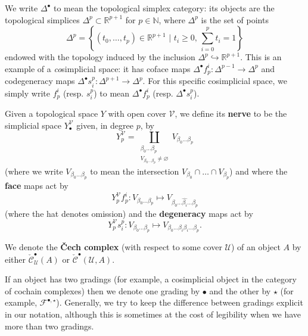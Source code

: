 \documentclass[11pt,fleqn]{article}
\theoremstyle{plain}
\theoremstyle{definition}
\theoremstyle{remark}
\numberwithin{equation}{theorem}
\newcommand{\cover}{\mathcal{U}}
\newcommand{\anothercover}{\mathcal{V}}
\newcommand{\anotherbullet}{\star}
\newcommand{\cech}{\check{\mathscr{C}}}
\newcommand{\define}[1]{\textbf{#1}}
\newcommand{\anothernerve}[1]{Y_{#1}^\anothercover}
\begin{document}
        We write $\Delta^\bullet$ to mean the topological simplex category: its objects are the topological simplices $\Delta^p\subset\mathbb{R}^{p+1}$ for $p\in\mathbb{N}$, where $\Delta^p$ is the set of points
        \[
            \Delta^p
            =
            \left\{
                (t_0,\ldots,t_p)
                \in \mathbb{R}^{p+1}
                \,\,\Big\vert\,\,
                t_i\geqslant0,
                \,\sum_{i=0}^p t_i =1
            \right\}
        \]
        endowed with the topology induced by the inclusion $\Delta^p\hookrightarrow\mathbb{R}^{p+1}$.
        This is an example of a \emph{co}simplicial space: it has {coface} maps $\Delta^\bullet f_p^i\colon\Delta^{p-1}\to\Delta^p$ and {codegeneracy} maps $\Delta^\bullet s_i^p\colon\Delta^{p+1}\to\Delta^p$.
        For this specific cosimplicial space, we simply write $f_p^i$ (resp. $s_i^p$) to mean $\Delta^\bullet f_p^i$ (resp. $\Delta^\bullet s_i^p$).

        Given a topological space $Y$ with open cover $\anothercover$, we define its \define{nerve} to be the simplicial space $\anothernerve{\bullet}$ given, in degree $p$, by
        \[
            \anothernerve{p} = \coprod_{\substack{\beta_0\ldots\beta_p \\ V_{\beta_0\ldots\beta_p}\neq\varnothing}} V_{\beta_0\ldots\beta_p}
        \]
        (where we write $V_{\beta_0\ldots\beta_p}$ to mean the intersection $V_{\beta_0}\cap\ldots\cap V_{\beta_p}$) and where the \define{face} maps act by
        \[
            \anothernerve{p}f_p^i\colon V_{\beta_0\ldots\beta_p} \mapsto V_{\beta_0\ldots\widehat{\beta_i}\ldots\beta_p}
        \]
        (where the hat denotes omission) and the \define{degeneracy} maps act by
        \[
            \anothernerve{p}s_i^p\colon V_{\beta_0\ldots\beta_p} \mapsto V_{\beta_0\ldots\beta_i\beta_i\ldots\beta_p}.
        \]

        \medskip

        We denote the \define{Čech complex} (with respect to some cover $\cover$) of an object $A$ by either $\cech_\cover^\bullet(A)$ or $\cech^\bullet(\cover,A)$.

        \medskip

        If an object has two gradings (for example, a cosimplicial object in the category of cochain complexes) then we denote one grading by $\bullet$ and the other by $\anotherbullet$ (for example, $\mathscr{F}^{\bullet,\anotherbullet}$).
        Generally, we try to keep the difference between gradings explicit in our notation, although this is sometimes at the cost of legibility when we have more than two gradings.
\end{document}
